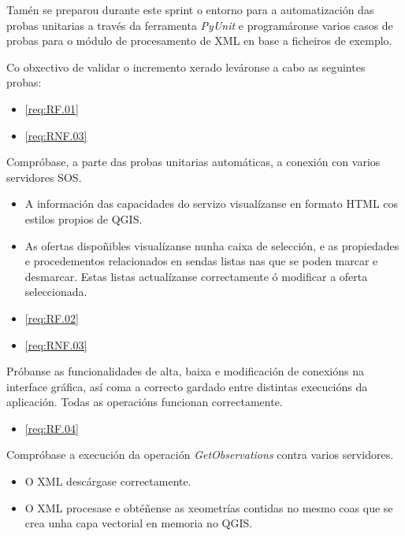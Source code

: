 Tamén se preparou durante este sprint o entorno para a automatización das probas unitarias a través da ferramenta \emph{PyUnit} e programáronse varios casos de probas para o módulo de procesamento de XML en base a ficheiros de exemplo.

Co obxectivo de validar o incremento xerado leváronse a cabo as seguintes probas:

		  {\begin{itemize}\item \ref{req:RF.01} \item \ref{req:RNF.03}\end{itemize}} %
		  {Compróbase, a parte das probas unitarias automáticas, a conexión con varios servidores SOS.} %
		  {\begin{itemize}
		  \item A información das capacidades do servizo visualízanse en formato HTML cos estilos propios de QGIS.
		  \item As ofertas dispoñibles visualízanse nunha caixa de selección, e as propiedades e procedementos relacionados en sendas listas nas que se poden marcar e desmarcar. Estas listas actualízanse correctamente ó modificar a oferta seleccionada.
		  \end{itemize}} %
		  
		  {\begin{itemize}\item \ref{req:RF.02} \item \ref{req:RNF.03}\end{itemize}} %
		  {Próbanse as funcionalidades de alta, baixa e modificación de conexións na interface gráfica, así coma a correcto gardado entre distintas execucións da aplicación.} %
		  {Todas as operacións funcionan correctamente.} %

		  {\begin{itemize}\item \ref{req:RF.04} \\\end{itemize}} %
		  {Compróbase a execución da operación \emph{GetObservations} contra varios servidores.} %
		  {\begin{itemize}
		  \item O XML descárgase correctamente.
		  \item O XML procesase e obtéñense as xeometrías contidas no mesmo coas que se crea unha capa vectorial en memoria no QGIS.
		  \end{itemize}} %
		  
